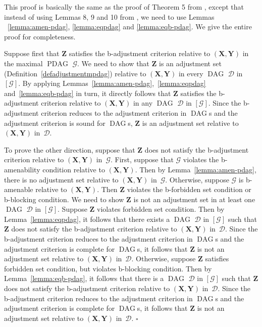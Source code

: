 \documentclass[letterpaper]{article}
\theoremstyle{definition}
\newenvironment{proofof}[1][]{\begin{trivlist}
   \item[\hskip \labelsep {\bfseries Proof of #1.}]}{\hfill{}$\square$\end{trivlist}}
\theoremstyle{remark}
\DeclareMathOperator{\PDAG}{PDAG}
\DeclareMathOperator{\DAG}{DAG}
\newcommand{\forb}{the forbidden set condition}
\newcommand{\bamen}{the b-amenability condition}
\newcommand{\bforb}{the b-forbidden set condition}
\newcommand{\bblck}{the b-blocking condition}
\newcommand{\mpdag}{maximal $\PDAG$}
\newcommand{\g}[1][G]{\mathcal{#1}}
\begin{document}
\begin{proofof}[Theorem~\ref{theorem:gac-pdag}]
This proof is basically the same as the proof of Theorem 5 from \cite{perkovic16}, except that instead of using Lemmas 8, 9 and 10 from \cite{perkovic16}, we need to use Lemmas ~\ref{lemma:amen-pdag}, \ref{lemma:eqpdag} and \ref{lemma:eqb-pdag}. We give the entire proof for completeness.

 Suppose first that $\mathbf{Z}$ satisfies the b-adjustment criterion relative to $(\mathbf{X,Y})$ in the \mpdag{} $\g$. We need to show that $\mathbf{Z}$ is an adjustment set (Definition~\ref{defadjustmentmpdag}) relative to $(\mathbf{X,Y})$ in every $\DAG$ $\g[D]$ in $[\g]$. By applying Lemmas~\ref{lemma:amen-pdag},~\ref{lemma:eqpdag} and~\ref{lemma:eqb-pdag} in turn, it directly follows that $\mathbf{Z}$ satisfies the b-adjustment criterion relative to $(\mathbf{X,Y})$ in any $\DAG$ $\g[D]$ in $[\g]$.
  Since the b-adjustment criterion reduces to the adjustment criterion \citep{shpitser2012validity,shpitser2012avalidity} in $\DAG$s and the adjustment criterion is sound for $\DAG$s, $\mathbf{Z}$ is an adjustment set relative to $(\mathbf{X,Y})$ in~$\g[D]$.

   To prove the other direction, suppose that $\mathbf{Z}$ does not satisfy the b-adjustment criterion relative to $(\mathbf{X,Y})$ in~$\g$. First, suppose that $\g$ violates \bamen{} relative to $(\mathbf{X},\mathbf{Y})$. Then by Lemma~\ref{lemma:amen-pdag}, there is no adjustment set relative to $(\mathbf{X},\mathbf{Y})$ in~$\g$.
   Otherwise, suppose $\g$ is b-amenable relative to $(\mathbf{X,Y})$. Then $\mathbf{Z}$ violates \bforb{} or \expandafter\ignorespaces\bblck{}. 
   We need to show $\mathbf{Z}$ is not an adjustment set in at least one $\DAG$ $\g[D]$ in $[\g]$.
   Suppose $\mathbf{Z}$ violates \expandafter\ignorespaces\forb. Then by Lemma~\ref{lemma:eqpdag}, it follows that there exists a $\DAG$ $\g[D]$ in $[\g]$ such that $\mathbf{Z}$ does not satisfy the b-adjustment criterion relative to $(\mathbf{X,Y})$ in~$\g[D]$.   Since the b-adjustment criterion reduces to the adjustment criterion \citep{shpitser2012validity,shpitser2012avalidity} in $\DAG$s and the adjustment criterion is complete for $\DAG$s, it follows that $\mathbf{Z}$ is not an adjustment set relative to $(\mathbf{X,Y})$ in~$\g[D]$.
   Otherwise, suppose $\mathbf{Z}$ satisfies \expandafter\ignorespaces\forb, but violates \expandafter\ignorespaces\bblck{}. Then by Lemma~\ref{lemma:eqb-pdag}, it follows that there is a $\DAG$ $\g[D]$ in $[\g]$ such that $\mathbf{Z}$ does not satisfy the b-adjustment criterion relative to $(\mathbf{X,Y})$ in~$\g[D]$.   Since the b-adjustment criterion reduces to the adjustment criterion \citep{shpitser2012validity,shpitser2012avalidity} in $\DAG$s and the adjustment criterion is complete for $\DAG$s, it follows that $\mathbf{Z}$ is not an adjustment set relative to $(\mathbf{X,Y})$ in~$\g[D]$.
\end{proofof}
\end{document}
